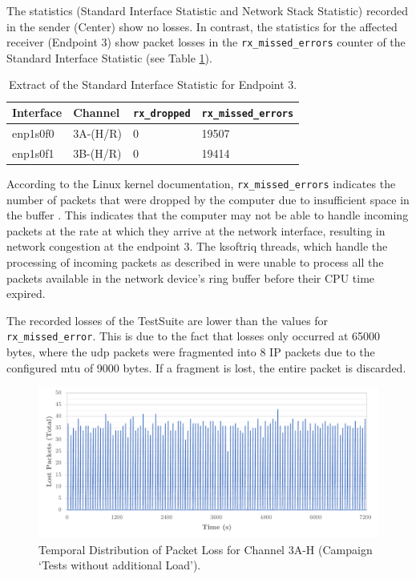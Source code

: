The statistics (Standard Interface Statistic and Network Stack Statistic) recorded in the sender (Center) show no losses. In contrast, the statistics for the affected receiver (Endpoint 3) show packet losses in the \texttt{rx\_missed\_errors} counter of the Standard Interface Statistic (see Table \ref{tab:ep3InterfaceStat}).

\begin{table}[h]
\centering
\begin{tabular}{l|l|l|l}
	\toprule
	\textbf{Interface} & \textbf{Channel} & \textbf{\texttt{rx\_dropped}} & \textbf{\texttt{rx\_missed\_errors}} \\
	\midrule
 	enp1s0f0 & 3A-(H/R) & 0 & 19507 \\ 
 	enp1s0f1 & 3B-(H/R) & 0 & 19414 \\
	\bottomrule
\end{tabular}
\caption{Extract of the Standard Interface Statistic for Endpoint 3.}
\label{tab:ep3InterfaceStat}
\end{table}

According to the Linux kernel documentation, \texttt{rx\_missed\_errors} indicates the number of packets that were dropped by the computer due to insufficient space in the buffer \cite{sock11}. This indicates that the computer may not be able to handle incoming packets at the rate at which they arrive at the network interface, resulting in network congestion at the endpoint 3. The ksoftriq threads, which handle the processing of incoming packets as described in \label{chap:recpath} were unable to process all the packets available in the network device's ring buffer before their \ac{CPU} time expired.

The recorded losses of the TestSuite are lower than the values for \texttt{rx\_missed\_error}. This is due to the fact that losses only occurred at 65000 bytes, where the \ac{udp} packets were fragmented into 8 IP packets due to the configured \ac{mtu} of 9000 bytes. If a fragment is lost, the entire packet is discarded.

\begin{figure}[h!]
    \centering
    \includegraphics[width=1\linewidth]{figures/reliability/ihawk/diagr6.pdf}
    \caption{Temporal Distribution of Packet Loss for Channel 3A-H (Campaign `Tests without additional Load').}
    \label{fig:diagr6Temp}
\end{figure}

